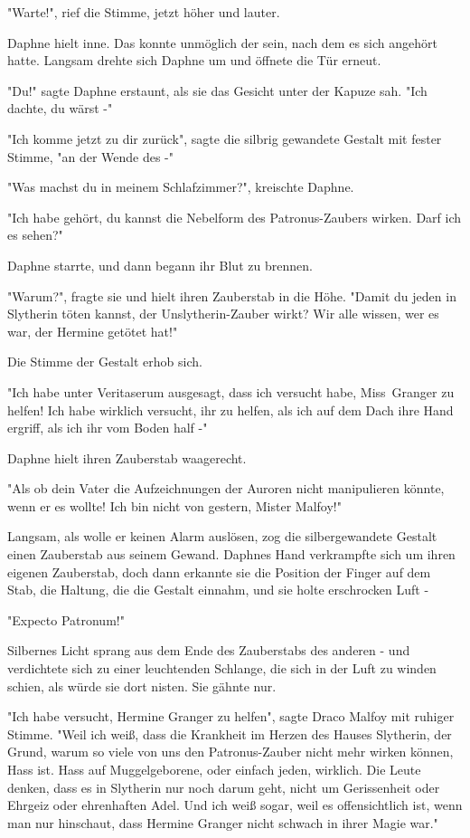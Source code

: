 {"Warte!", rief die Stimme, jetzt höher und lauter.

Daphne hielt inne. Das konnte unmöglich der sein, nach dem es sich angehört hatte. Langsam drehte sich Daphne um und öffnete die Tür erneut.

"Du!" sagte Daphne erstaunt, als sie das Gesicht unter der Kapuze sah. "Ich dachte, du wärst -"

"Ich komme jetzt zu dir zurück", sagte die silbrig gewandete Gestalt mit fester Stimme, "an der Wende des -"

"Was machst du in meinem Schlafzimmer?", kreischte Daphne.

"Ich habe gehört, du kannst die Nebelform des Patronus-Zaubers wirken. Darf ich es sehen?"

Daphne starrte, und dann begann ihr Blut zu brennen.

"Warum?", fragte sie und hielt ihren Zauberstab in die Höhe. "Damit du jeden in Slytherin töten kannst, der Unslytherin-Zauber wirkt? Wir alle wissen, wer es war, der Hermine getötet hat!"

Die Stimme der Gestalt erhob sich.

"Ich habe unter Veritaserum ausgesagt, dass ich versucht habe, Miss~Granger zu helfen! Ich habe wirklich versucht, ihr zu helfen, als ich auf dem Dach ihre Hand ergriff, als ich ihr vom Boden half -"

Daphne hielt ihren Zauberstab waagerecht.

"Als ob dein Vater die Aufzeichnungen der Auroren nicht manipulieren könnte, wenn er es wollte! Ich bin nicht von gestern, Mister Malfoy!"

Langsam, als wolle er keinen Alarm auslösen, zog die silbergewandete Gestalt einen Zauberstab aus seinem Gewand. Daphnes Hand verkrampfte sich um ihren eigenen Zauberstab, doch dann erkannte sie die Position der Finger auf dem Stab, die Haltung, die die Gestalt einnahm, und sie holte erschrocken Luft -

"Expecto Patronum!"

Silbernes Licht sprang aus dem Ende des Zauberstabs des anderen - und verdichtete sich zu einer leuchtenden Schlange, die sich in der Luft zu winden schien, als würde sie dort nisten. Sie gähnte nur.

"Ich habe versucht, Hermine Granger zu helfen", sagte Draco Malfoy mit ruhiger Stimme. "Weil ich weiß, dass die Krankheit im Herzen des Hauses Slytherin, der Grund, warum so viele von uns den Patronus-Zauber nicht mehr wirken können, Hass ist. Hass auf Muggelgeborene, oder einfach jeden, wirklich. Die Leute denken, dass es in Slytherin nur noch darum geht, nicht um Gerissenheit oder Ehrgeiz oder ehrenhaften Adel. Und ich weiß sogar, weil es offensichtlich ist, wenn man nur hinschaut, dass Hermine Granger nicht schwach in ihrer Magie war."

}
